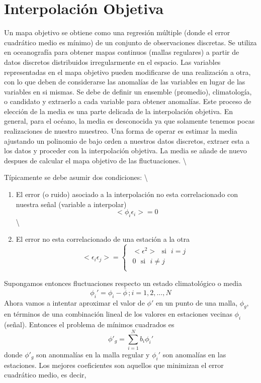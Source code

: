 \documentclass[
]{agujournal2019}
\providecommand{\tightlist}{%
  \setlength{\itemsep}{0pt}\setlength{\parskip}{0pt}}\usepackage{longtable,booktabs,array}
\begin{document}
\hypertarget{interpolaciuxf3n-objetiva}{%
\section{Interpolación Objetiva}\label{interpolaciuxf3n-objetiva}}

Un mapa objetivo se obtiene como una regresión múltiple (donde el error
cuadrático medio es mínimo) de un conjunto de observaciones discretas.
Se utiliza en oceanografía para obtener mapas continuos (mallas
regulares) a partir de datos discretos distribuidos irregularmente en el
espacio. Las variables representadas en el mapa objetivo pueden
modificarse de una realización a otra, con lo que deben de considerarse
las anomalías de las variables en lugar de las variables en si mismas.
Se debe de definir un ensemble (promedio), climatología, o candidato y
extraerlo a cada variable para obtener anomalías. Este proceso de
elección de la media es una parte delicada de la interpolación objetiva.
En general, para el océano, la media es desconocida ya que solamente
tenemos pocas realizaciones de nuestro muestreo. Una forma de operar es
estimar la media ajustando un polinomio de bajo orden a nuestros datos
discretos, extraer esta a los datos y proceder con la interpolación
objetiva. La media se añade de nuevo despues de calcular el mapa
objetivo de las fluctuaciones. \textbackslash{}

Típicamente se debe asumir dos condiciones: \textbackslash{}

\begin{enumerate}
\def\labelenumi{(\arabic{enumi})}
\tightlist
\item
  El error (o ruido) asociado a la interpolación no esta correlacionado
  con nuestra señal (variable a interpolar) \[<\phi_i\epsilon_i>=0\]
  \textbackslash{}
\item
  El error no esta correlacionado de una estación a la otra
  \[<\epsilon_i \epsilon_j>=
  \begin{cases}
  \begin{array}{c}
     <\epsilon^2> \,\,\,\,\text{si} \,\,\,\,i=j\\
     0    \,\,\,\,        \text{si} \,\,\,\,i\ne j\\
  \end{array}
  \end{cases}\]
\end{enumerate}

Supongamos entonces fluctuaciones respecto un estado climatológico o
media \[\phi_i'=\phi_i-\bar{\phi}\,; i=1,2,...,N\] Ahora vamos a
intentar aproximar el valor de \(\phi'\) en un punto de una malla,
\(\phi_g\), en términos de una combinación lineal de los valores en
estaciones vecinas \(\phi_i\) (señal). Entonces el problema de mínimos
cuadrados es \[\phi'_g=\sum\limits^N_{i=1}b_i\phi_i'\] donde \(\phi'_g\)
son anonmalías en la malla regular y \(\phi_i'\) son anomalías en las
estaciones. Los mejores coeficientes son aquellos que minimizan el error
cuadrático medio, es decir,
\end{document}
